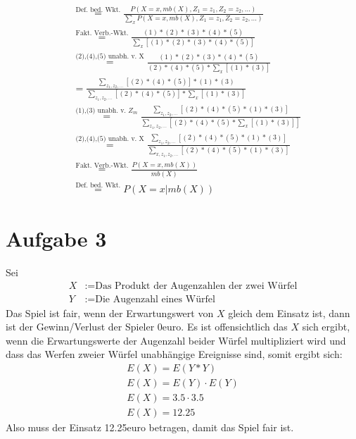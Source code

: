 \documentclass[a4paper,10pt]{article}
\begin{document}
\begin{enumerate}[~~a.)]
\begin{align*}
	 	&\stackrel{\text{Def. bed. Wkt.}}= \frac{P(X=x , mb(X), Z_{1} = z_{1}, Z_{2} = z_{2}, ...)}{\sum_{x} P(X = x , mb(X), Z_{1} = z_{1}, Z_{2} = z_{2}, ...)}\\
	 	&\stackrel{\text{Fakt. Verb.-Wkt.}}= \frac{(1)*(2)*(3)*(4)*(5)}{\sum_{x}[(1)*(2)*(3)*(4)*(5)]} \\
	 	&\stackrel{\text{(2),(4),(5) unabh. v. X}}= \frac{(1)*(2)*(3)*(4)*(5)}{(2)*(4)*(5)*\sum_{x}[(1)*(3)]} \\
	 	&= \frac{\sum_{z_{1}, z_{2},...}[(2)*(4)*(5)]*(1)*(3)}{\sum_{z_{1}, z_{2},...}[(2)*(4)*(5)]*\sum_{x}[(1)*(3)]} \\	
	 	&\stackrel{\text{(1),(3) unabh. v. } Z_{m}}= \frac{\sum_{z_{1}, z_{2},...}[(2)*(4)*(5)*(1)*(3)]}{\sum_{z_{1}, z_{2},...}[(2)*(4)*(5)*\sum_{x}[(1)*(3)]]} \\
	 	&\stackrel{\text{(2),(4),(5) unabh. v. X}}= \frac{\sum_{z_{1}, z_{2},...}[(2)*(4)*(5)*(1)*(3)]}{\sum_{x,z_{1}, z_{2},...}[(2)*(4)*(5)*(1)*(3)]} \\
	 	&\stackrel{\text{Fakt. Verb.-Wkt.}}= \frac{P(X = x, mb(X))}{mb(X)} \\
	 	&\stackrel{\text{Def. bed. Wkt.}}=P(X = x | mb(X))
		\end{align*}	 	 			
	\end{enumerate}
\section*{Aufgabe 3}
Sei
\begin{align*}
    X &:= \text{Das Produkt der Augenzahlen der zwei Würfel} \\
    Y &:= \text{Die Augenzahl eines Würfel}
\end{align*}
Das Spiel ist fair, wenn der Erwartungswert von $X$ gleich dem Einsatz ist, dann ist der Gewinn/Verlust der Spieler 0euro. Es ist offensichtlich das $X$ sich ergibt, wenn die Erwartungswerte der Augenzahl beider Würfel multipliziert wird und dass das Werfen zweier Würfel unabhängige Ereignisse sind, somit ergibt sich:
\begin{align*}
    E(X) = E(Y*Y) \\
    E(X) = E(Y) \cdot E(Y) \\
    E(X) = 3.5 \cdot 3.5 \\
    E(X) = 12.25
\end{align*}
Also muss der Einsatz 12.25euro betragen, damit das Spiel fair ist.
\end{document}
